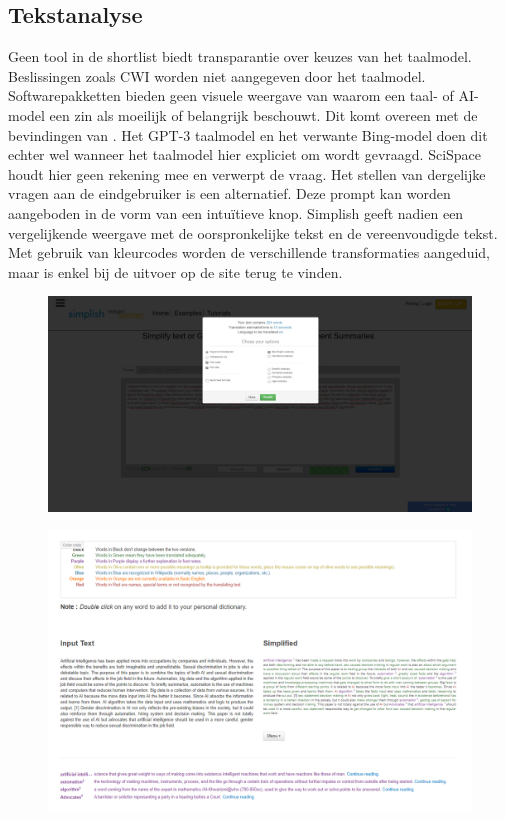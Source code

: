 
\subsection{Tekstanalyse}
Geen tool in de shortlist biedt transparantie over keuzes van het taalmodel. Beslissingen zoals CWI worden niet aangegeven door het taalmodel. Softwarepakketten bieden geen visuele weergave van waarom een taal- of AI-model een zin als moeilijk of belangrijk beschouwt. Dit komt overeen met de bevindingen van \textcite{Gooding2019}. Het GPT-3 taalmodel en het verwante Bing-model doen dit echter wel wanneer het taalmodel hier expliciet om wordt gevraagd. SciSpace houdt hier geen rekening mee en verwerpt de vraag. Het stellen van dergelijke vragen aan de eindgebruiker is een alternatief. Deze prompt kan worden aangeboden in de vorm van een intuïtieve knop. Simplish geeft nadien een vergelijkende weergave met de oorspronkelijke tekst en de vereenvoudigde tekst. Met gebruik van kleurcodes worden de verschillende transformaties aangeduid, maar is enkel bij de uitvoer op de site terug te vinden.

\begin{figure}[H]
	\includegraphics[width=\linewidth]{img/simplish-input.png}
\end{figure}

\begin{figure}[H]
	\includegraphics[width=\linewidth]{img/simplish-output.png}
\end{figure}

